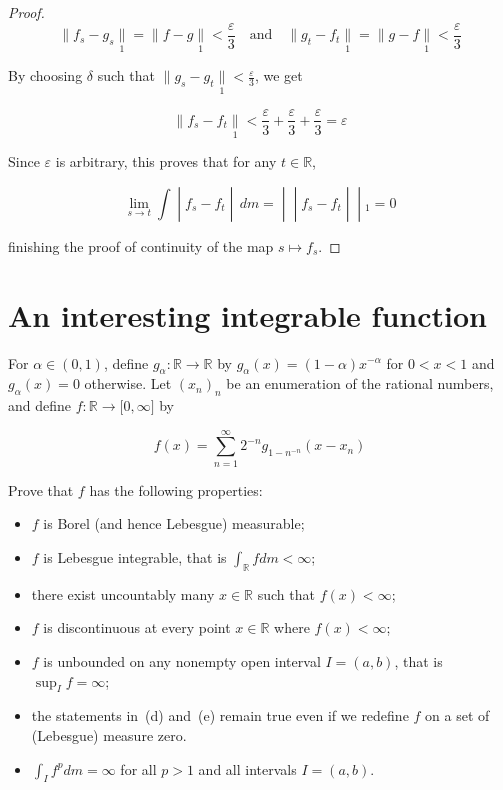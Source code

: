 \begin{proof}
\[\parallel f_{s} - g_{s}\underset{1}{\parallel} = \parallel f - g\underset{1}{\parallel} < \frac{\varepsilon}{3}\quad\text{and}\quad \parallel g_{t} - f_{t}\underset{1}{\parallel} = \parallel g - f\underset{1}{\parallel} < \frac{\varepsilon}{3}\]

By choosing \(\delta\) such that \(\parallel g_{s} - g_{t}\underset{1}{\parallel} < \frac{\varepsilon}{3}\), we get

\[\parallel f_{s} - f_{t}\underset{1}{\parallel} < \frac{\varepsilon}{3} + \frac{\varepsilon}{3} + \frac{\varepsilon}{3} = \varepsilon\]

Since \(\varepsilon\) is arbitrary, this proves that for any \(t \in \mathbb{R}\),

\[\left. \lim\limits_{s\rightarrow t}\int \middle| f_{s} - f_{t} \middle| \, dm = \middle| \middle| f_{s} - f_{t} \middle| \middle| {}_{1} = 0 \right.\]

finishing the proof of continuity of the map \(s\mapsto f_{s}\).

\end{proof}

\section{An interesting integrable function}\label{an-interesting-integrable-function}

For \(\alpha \in (0,1)\), define \(g_{\alpha}:\mathbb{R}\rightarrow\mathbb{R}\) by \(g_{\alpha}(x) = (1 - \alpha)x^{- \alpha}\) for \(0 < x < 1\) and \(g_{\alpha}(x) = 0\) otherwise. Let \((x_{n})_{n}\) be an enumeration of the rational numbers, and define \(f:\mathbb{R}\rightarrow\lbrack 0,\infty\rbrack\) by

\[f(x) = \sum\limits_{n = 1}^{\infty}2^{- n}g_{1 - n^{- n}}(x - x_{n})\]

Prove that \(f\) has the following properties:

\begin{itemize}
\item
  \(f\) is Borel (and hence Lebesgue) measurable;
\item
  \(f\) is Lebesgue integrable, that is \(\int_{\mathbb{R}}f dm < \infty\);
\item
  there exist uncountably many \(x \in \mathbb{R}\) such that \(f(x) < \infty\);
\item
  \(f\) is discontinuous at every point \(x \in \mathbb{R}\) where \(f(x) < \infty\);
\item
  \(f\) is unbounded on any nonempty open interval \(I = (a,b)\), that is \(\sup_{I}f = \infty\);
\item
  the statements in~(d) and~(e) remain true even if we redefine \(f\) on a set of (Lebesgue) measure zero.
\item
  \(\int_{I}f^{p} dm = \infty\) for all \(p > 1\) and all intervals \(I = (a,b)\).
\end{itemize}

